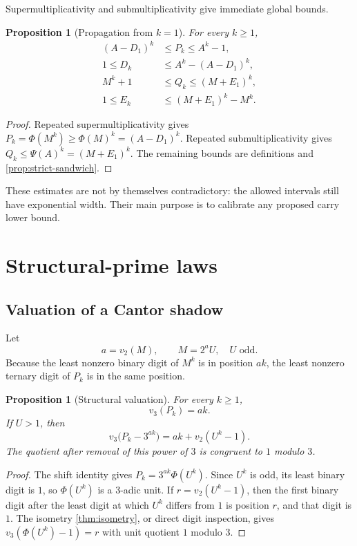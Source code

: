 \documentclass[11pt]{article}
\newtheorem{proposition}[theorem]{Proposition}
\theoremstyle{definition}
\theoremstyle{remark}
\newcommand{\vTwo}{v_2}
\newcommand{\vThree}{v_3}
\newcommand{\PhiMap}{\Phi}
\newcommand{\PsiMap}{\Psi}
\begin{document}
Supermultiplicativity and submultiplicativity give immediate global bounds.

\begin{proposition}[Propagation from $k=1$]\label{prop:first-defect-prop}
For every $k\ge1$,
\begin{align*}
  (A-D_1)^k&\le P_k\le A^k-1,\\
  1\le D_k&\le A^k-(A-D_1)^k,\\
  M^k+1&\le Q_k\le(M+E_1)^k,\\
  1\le E_k&\le(M+E_1)^k-M^k.
\end{align*}
\end{proposition}

\begin{proof}
Repeated supermultiplicativity gives
$P_k=\PhiMap(M^k)\ge\PhiMap(M)^k=(A-D_1)^k$.
Repeated submultiplicativity gives
$Q_k\le\PsiMap(A)^k=(M+E_1)^k$.  The remaining bounds are definitions and
\cref{prop:strict-sandwich}.
\end{proof}

These estimates are not by themselves contradictory: the allowed intervals
still have exponential width.  Their main purpose is to calibrate any proposed
carry lower bound.

\section{Structural-prime laws}

\subsection{Valuation of a Cantor shadow}

Let
\[
  a=\vTwo(M),\qquad M=2^aU,\quad U\text{ odd}.
\]
Because the least nonzero binary digit of $M^k$ is in position $ak$, the least
nonzero ternary digit of $P_k$ is in the same position.

\begin{proposition}[Structural valuation]\label{prop:Pk-valuation}
For every $k\ge1$,
\[
  \vThree(P_k)=ak.
\]
If $U>1$, then
\begin{equation}\label{eq:Pk-anchor}
 \boxed{
 \vThree\bigl(P_k-3^{ak}\bigr)
 =ak+\vTwo(U^k-1).}
\end{equation}
The quotient after removal of this power of $3$ is congruent to $1$ modulo
$3$.
\end{proposition}

\begin{proof}
The shift identity gives $P_k=3^{ak}\PhiMap(U^k)$.  Since $U^k$ is odd, its
least binary digit is $1$, so $\PhiMap(U^k)$ is a $3$-adic unit.  If
$r=\vTwo(U^k-1)$, then the first binary digit after the least digit at which
$U^k$ differs from $1$ is position $r$, and that digit is $1$.  The isometry
\cref{thm:isometry}, or direct digit inspection, gives
$\vThree(\PhiMap(U^k)-1)=r$ with unit quotient $1$ modulo $3$.
\end{proof}
\end{document}

